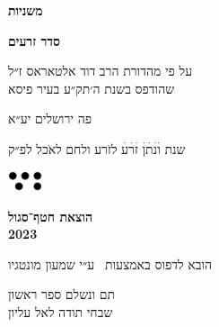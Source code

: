 \documentclass[14pt, a5paper, twoside, extrafontsizes]{memoir}
\begin{document}
\frontmatter
\pagestyle{myheadings}
\thispagestyle{mytitlepage}
\begin{hebrew}
{\Centering  

  {\huge\bfseries משניות}
  
  {\LARGE\bfseries סדר זרעים}

  \vspace{1em}

  \vspace{0.5em}
  על פי מהדורת הרב דוד אלטאראס ז״ל\\שהודפס בשנת ה׳תק״ע בעיר פיסא

    \vspace{8em}
    פה {\LARGE ירושלים} יע״א

    {\small שנת}
    {\Large וׄנׄתׄןׄ זׄרׄעׄ}
    לזֹרע ולחם לאֹכל
    {\small לפ״ק}
    
    \vspace{2em}
  \includegraphics[width=10mm]{hatafSegolLogoNoText.png}\\
  
    \vspace{.5em}
  {
    \bfseries הוצאת חטף־סגול\\2023
    
 {\footnotesize  הובא לדפוס באמצעות \XeLaTeX\ ע״י שמעון מונטגיו}

  }
    
}




\vspace{2em}

\mainmatter
\thispagestyle{empty}













\def \sederCount{ראשון}


{\centering
  \LARGE תם ונשלם ספר ראשון\\שבחי תודה לאל עליון
}

\tractatehead{~}{~} %
\end{hebrew}
\end{document}
